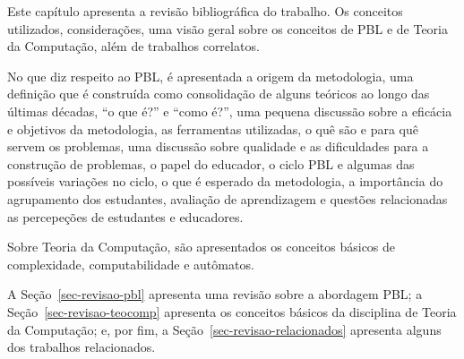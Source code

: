 \label{cap-revisao}
\acresetall

Este capítulo apresenta a revisão bibliográfica do trabalho.
Os conceitos utilizados, considerações, uma visão geral sobre os conceitos
de \ac{PBL} e de Teoria da Computação, além de trabalhos correlatos.

No que diz respeito ao \ac{PBL}, é apresentada a origem da metodologia,
uma definição que é construída como consolidação de alguns teóricos ao longo das últimas
décadas, ``o que é?'' e ``como é?'', uma pequena discussão sobre a eficácia e objetivos
da metodologia, as ferramentas utilizadas, o quê são e para quê servem os problemas, uma
discussão sobre qualidade e as dificuldades para a construção de problemas, o papel
do educador, o ciclo \ac{PBL} e algumas das possíveis variações no ciclo, o que é
esperado da metodologia, a importância do agrupamento dos estudantes,
avaliação de aprendizagem e questões relacionadas as percepeções de estudantes
e educadores.

Sobre Teoria da Computação, são apresentados os conceitos
básicos de complexidade, computabilidade e autômatos.

A Seção~\ref{sec-revisao-pbl} apresenta uma revisão sobre a abordagem \ac{PBL};
a Seção~\ref{sec-revisao-teocomp} apresenta os conceitos básicos da disciplina
de Teoria da Computação;
e, por fim, a Seção~\ref{sec-revisao-relacionados} apresenta alguns dos trabalhos
relacionados.




